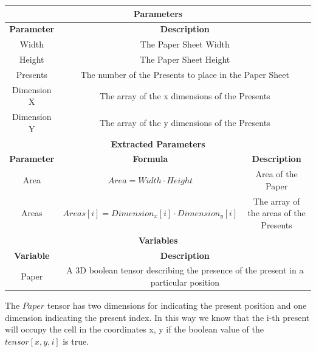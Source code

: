 \begin{center}
    \begin{adjustwidth}{-1.5cm}{}
        \begin{tabular}{|c|c|c|}
            \hline
            \multicolumn{3}{|c|}{\textbf{Parameters}} \\
            \hline
            \textbf{Parameter} & \multicolumn{2}{|c|}{\textbf{Description}} \\
            \hline
            Width & \multicolumn{2}{|c|}{The Paper Sheet Width} \\
            \hline
            Height & \multicolumn{2}{|c|}{The Paper Sheet Height} \\
            \hline
            Presents & \multicolumn{2}{|c|}{The number of the Presents to place in the Paper Sheet} \\
            \hline
            Dimension X & \multicolumn{2}{|c|}{The array of the x dimensions of the Presents} \\
            \hline
            Dimension Y & \multicolumn{2}{|c|}{The array of the y dimensions of the Presents} \\
            \hline
            \multicolumn{3}{|c|}{\textbf{Extracted Parameters}} \\
            \hline
            \textbf{Parameter} & \textbf{Formula} & \textbf{Description} \\
            \hline
            Area & $Area = Width \cdot Height$ & Area of the Paper \\
            \hline
            Areas & $Areas[i] = Dimension_x[i] \cdot Dimension_y[i]$ & The array of the areas of the Presents \\
            \hline
            \multicolumn{3}{|c|}{\textbf{Variables}} \\
            \hline
            \textbf{Variable} & \multicolumn{2}{|c|}{\textbf{Description}} \\
            \hline
            Paper &  \multicolumn{2}{|c|}{A 3D boolean tensor describing the presence of the present in a particular position} \\
            \hline
        \end{tabular}
    \end{adjustwidth}
\end{center}

\newpage
The $Paper$ tensor has two dimensions for indicating the present position and one dimension indicating the present index. In this way
we know that the i-th present will occupy the cell in the coordinates x, y if the boolean value of the $tensor[x, y, i]$ is true.

